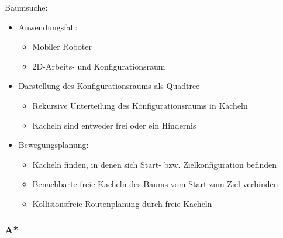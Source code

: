 \documentclass[paper=a4, fontsize=11pt]{scrartcl} %
\numberwithin{equation}{section} %
\numberwithin{figure}{section} %
\numberwithin{table}{section} %
\begin{document}
Baumsuche:
\begin{itemize}
\item Anwendungsfall:
\begin{itemize}
\item Mobiler Roboter
\item 2D-Arbeits- und Konfigurationsraum
\end{itemize}
\item Darstellung des Konfigurationsraums als Quadtree
\begin{itemize}
\item Rekursive Unterteilung des Konfigurationsraums in Kacheln
\item Kacheln sind entweder frei oder ein Hindernis
\end{itemize}
\item Bewegungsplanung:
\begin{itemize}
\item Kacheln finden, in denen sich Start- bzw. Zielkonfiguration befinden
\item Benachbarte freie Kacheln des Baums vom Start zum Ziel verbinden
\item Kollisionsfreie Routenplanung durch freie Kacheln
\end{itemize}
\end{itemize}

\subsubsection{A*}
\end{document}
